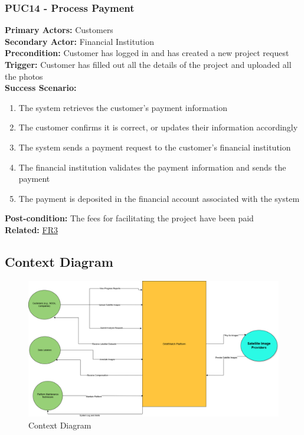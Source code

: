 \documentclass[12pt]{article}
\begin{document}
\subsubsection*{PUC14 - Process Payment}
\label{sec:PUC14}
\textbf{Primary Actors:} Customers\\
\textbf{Secondary Actor:} Financial Institution\\
\textbf{Precondition:} Customer has logged in and has created a new project request\\
\textbf{Trigger:} Customer has filled out all the details of the project and uploaded all the photos\\
\textbf{Success Scenario:}
\begin{enumerate}
    \item The system retrieves the customer's payment information
    \item The customer confirms it is correct, or updates their information accordingly
    \item The system sends a payment request to the customer's financial institution
    \item The financial institution validates the payment information and sends the payment
    \item The payment is deposited in the financial account associated with the system
\end{enumerate}
\textbf{Post-condition:} The fees for facilitating the project have been paid\\
\textbf{Related:} \hyperref[sec:FR3]{FR3}

\subsection*{Context Diagram}
\begin{figure}[H]
  \includegraphics[scale=0.3]{contextdiagram.png}
  \caption{Context Diagram}
      \label{fig:context}
  \end{figure}
\end{document}
